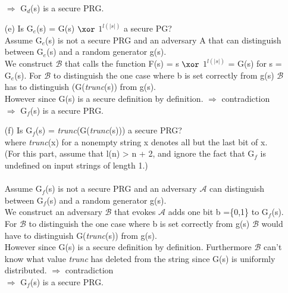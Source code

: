 \begin{itemize}
	\(\Rightarrow\) G\(_{d}\)(s) is a secure PRG.
\item[(e)]
	Is G\(_{e}\)(s) = G(s) \(\xor\) \(1^{ l(\vert s \vert)}\) a secure PG? \\
	Assume  G\(_{e}\)(s)  is not a secure PRG and an adversary A that can distinguish between  G\(_{e}\)(s) and a random generator g(s).\\
	We construct \(\mathcal{B}\) that calls the function F(s) = s \(\xor\) \(1^{ l(\vert s \vert)}\) = G(s) for s = G\(_{e}\)(s).
	For \(\mathcal{B}\) to distinguish the one case where b is set correctly from g(s) \(\mathcal{B}\) has to distinguish (G(\textit{trunc}(s)) from g(s).\\
	However since G(s) is a secure definition by definition.
	\(\Rightarrow\)  contradiction\\
	\(\Rightarrow\) G\(_{f}\)(s) is a secure PRG.
\item[(f)]
	Is G\(_{f}\)(s) = \textit{trunc}(G(\textit{trunc}(s))) a secure PRG? \\
	where \textit{trunc}(x) for a nonempty string x denotes all but the last bit of x. \\
	(For this part, assume that l(n) >  n + 2, and ignore the fact that G\(_{f}\) is undefined on input strings of length 1.) \\
	\\
	Assume G\(_{f}\)(s) is not a secure PRG and an adversary \(\mathcal{A}\) can distinguish between G\(_{f}\)(s) and a random generator g(s).\\
	We construct an adversary \(\mathcal{B}\) that evokes \(\mathcal{A}\) adds one bit b =\{0,1\} to  G\(_{f}\)(s).\\
	For \(\mathcal{B}\) to distinguish the one case where b is set correctly from g(s) \(\mathcal{B}\) would have to distinguish G(\textit{trunc}(s)) from g(s).\\
	However since G(s) is a secure definition by definition. Furthermore \(\mathcal{B}\) can't know what value \textit{trunc} has deleted from the string since 		G(s) is uniformly distributed.
	\(\Rightarrow\)  contradiction\\
	\(\Rightarrow\) G\(_{f}\)(s) is a secure PRG.
\end{itemize}
